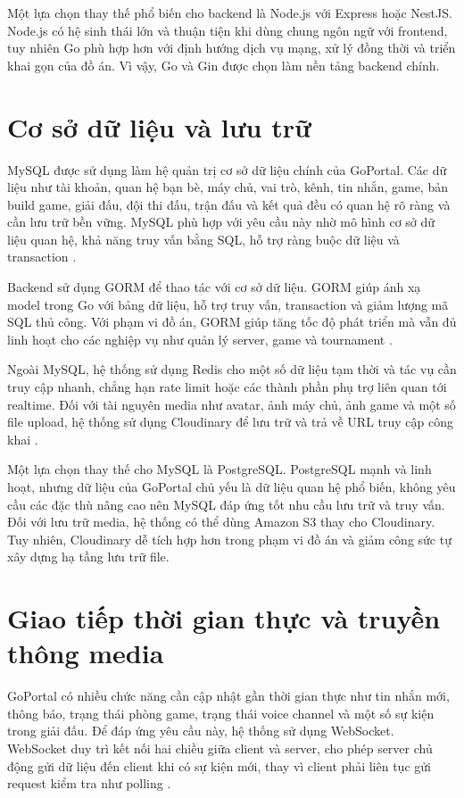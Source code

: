 Một lựa chọn thay thế phổ biến cho backend là Node.js với Express hoặc NestJS. Node.js có hệ sinh thái lớn và thuận tiện khi dùng chung ngôn ngữ với frontend, tuy nhiên Go phù hợp hơn với định hướng dịch vụ mạng, xử lý đồng thời và triển khai gọn của đồ án. Vì vậy, Go và Gin được chọn làm nền tảng backend chính.

\section{Cơ sở dữ liệu và lưu trữ}
\label{section:3.4}

MySQL được sử dụng làm hệ quản trị cơ sở dữ liệu chính của GoPortal. Các dữ liệu như tài khoản, quan hệ bạn bè, máy chủ, vai trò, kênh, tin nhắn, game, bản build game, giải đấu, đội thi đấu, trận đấu và kết quả đều có quan hệ rõ ràng và cần lưu trữ bền vững. MySQL phù hợp với yêu cầu này nhờ mô hình cơ sở dữ liệu quan hệ, khả năng truy vấn bằng SQL, hỗ trợ ràng buộc dữ liệu và transaction \cite{mysql-84}.

Backend sử dụng GORM để thao tác với cơ sở dữ liệu. GORM giúp ánh xạ model trong Go với bảng dữ liệu, hỗ trợ truy vấn, transaction và giảm lượng mã SQL thủ công. Với phạm vi đồ án, GORM giúp tăng tốc độ phát triển mà vẫn đủ linh hoạt cho các nghiệp vụ như quản lý server, game và tournament \cite{gorm-docs}.

Ngoài MySQL, hệ thống sử dụng Redis cho một số dữ liệu tạm thời và tác vụ cần truy cập nhanh, chẳng hạn rate limit hoặc các thành phần phụ trợ liên quan tới realtime. Đối với tài nguyên media như avatar, ảnh máy chủ, ảnh game và một số file upload, hệ thống sử dụng Cloudinary để lưu trữ và trả về URL truy cập công khai \cite{redis-docs,cloudinary-go}.

Một lựa chọn thay thế cho MySQL là PostgreSQL. PostgreSQL mạnh và linh hoạt, nhưng dữ liệu của GoPortal chủ yếu là dữ liệu quan hệ phổ biến, không yêu cầu các đặc thù nâng cao nên MySQL đáp ứng tốt nhu cầu lưu trữ và truy vấn. Đối với lưu trữ media, hệ thống có thể dùng Amazon S3 thay cho Cloudinary. Tuy nhiên, Cloudinary dễ tích hợp hơn trong phạm vi đồ án và giảm công sức tự xây dựng hạ tầng lưu trữ file.

\section{Giao tiếp thời gian thực và truyền thông media}
\label{section:3.5}

GoPortal có nhiều chức năng cần cập nhật gần thời gian thực như tin nhắn mới, thông báo, trạng thái phòng game, trạng thái voice channel và một số sự kiện trong giải đấu. Để đáp ứng yêu cầu này, hệ thống sử dụng WebSocket. WebSocket duy trì kết nối hai chiều giữa client và server, cho phép server chủ động gửi dữ liệu đến client khi có sự kiện mới, thay vì client phải liên tục gửi request kiểm tra như polling \cite{mdn-websocket}.

